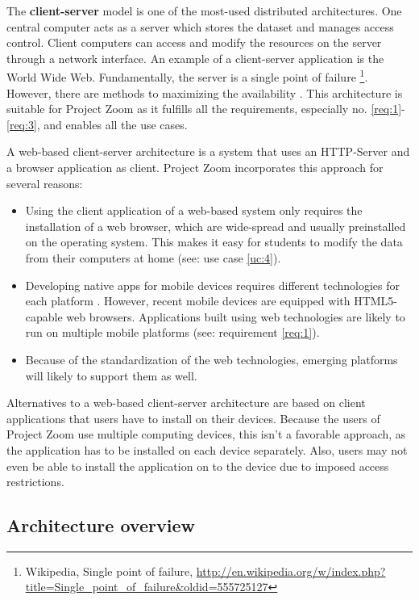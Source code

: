 The \textbf{client-server} \cite{Berson_1996} model is one of the most-used distributed architectures. One central computer acts as a server which stores the dataset and manages access control. Client computers can access and modify the resources on the server through a network interface. An example of a client-server application is the World Wide Web. Fundamentally, the server is a single point of failure \footnote{Wikipedia, Single point of failure, \url{http://en.wikipedia.org/w/index.php?title=Single_point_of_failure&oldid=555725127}}. However, there are methods to maximizing the availability \cite{Gray_1991} \cite{Colyer_2000}. This architecture is suitable for Project Zoom as it fulfills all the requirements, especially no. \ref{req:1}-\ref{req:3}, and enables all the use cases.

A web-based client-server architecture is a system that uses an HTTP-Server \cite{RFC2616} and a browser application as client. Project Zoom incorporates this approach for several reasons:
\begin{itemize}
\item Using the client application of a web-based system only requires the installation of a web browser, which are wide-spread and usually preinstalled on the operating system. This makes it easy for students to modify the data from their computers at home (see: use case \ref{uc:4}).
\item Developing native apps for mobile devices requires different technologies for each platform \cite{Charland_2011}. However, recent mobile devices are equipped with HTML5-capable \cite{W3C_HTML5} web browsers. Applications built using web technologies are likely to run on multiple mobile platforms (see: requirement \ref{req:1}).
\item Because of the standardization of the web technologies, emerging platforms will likely to support them as well.
\end{itemize}

Alternatives to a web-based client-server architecture are based on client applications that users have to install on their devices. Because the users of Project Zoom use multiple computing devices, this isn't a favorable approach, as the application has to be installed on each device separately. Also, users may not even be able to install the application on to the device due to imposed access restrictions.

\subsection{Architecture overview}


